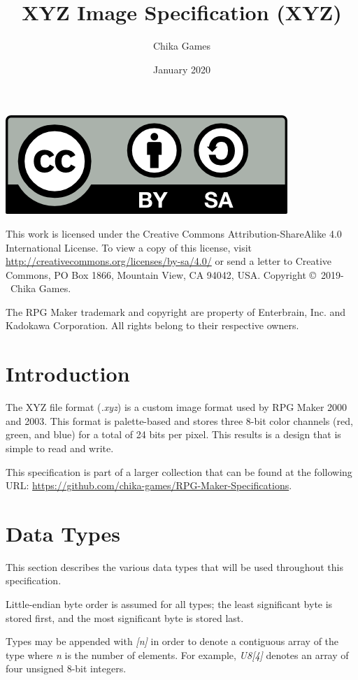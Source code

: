 \documentclass{article}
\title{XYZ Image Specification (XYZ)}
\author{Chika Games}
\date{January 2020}
\begin{document}
\maketitle
\tableofcontents

\newpage

\includegraphics[scale=0.75]{by-sa}

This work is licensed under the Creative Commons Attribution-ShareAlike 4.0 International License. To view a copy of this license, visit \url{http://creativecommons.org/licenses/by-sa/4.0/} or send a letter to Creative Commons, PO Box 1866, Mountain View, CA 94042, USA. Copyright \copyright~2019-\the\year~Chika Games.

The RPG Maker trademark and copyright are property of Enterbrain, Inc. and Kadokawa Corporation. All rights belong to their respective owners.

\newpage

\section{Introduction}
The XYZ file format (\textit{.xyz}) is a custom image format used by RPG Maker 2000 and 2003. This format is palette-based and stores three 8-bit color channels (red, green, and blue) for a total of 24 bits per pixel. This results is a design that is simple to read and write.

This specification is part of a larger collection that can be found at the following URL: \url{https://github.com/chika-games/RPG-Maker-Specifications}.

\section{Data Types}
This section describes the various data types that will be used throughout this specification.

Little-endian byte order is assumed for all types; the least significant byte is stored first, and the most significant byte is stored last.

Types may be appended with \textit{[n]} in order to denote a contiguous array of the type where \textit{n} is the number of elements. For example, \textit{U8[4]} denotes an array of four unsigned 8-bit integers.
\end{document}

